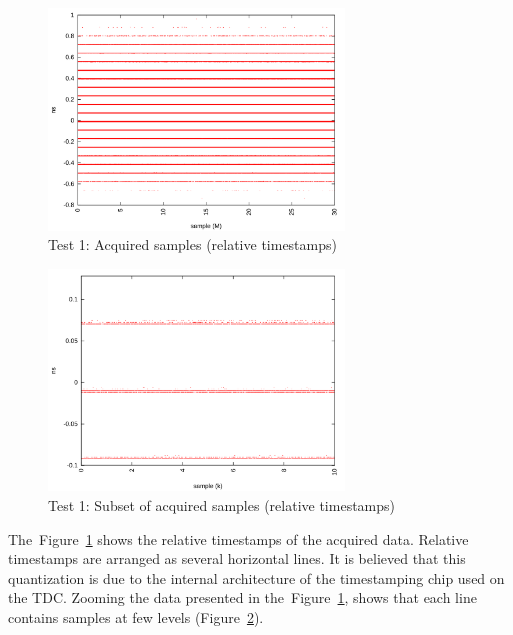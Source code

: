\documentclass[a4paper, 12pt]{article}
\begin{document}
\FloatBarrier

\begin{figure}[ht!]
  \centering
  \includegraphics[width=0.7\textwidth]{img/test1_samples_relative.png}
  \caption{Test 1: Acquired samples (relative timestamps)}
  \label{test1_relative}
\end{figure}

\begin{figure}[ht!]
  \centering
  \includegraphics[width=0.7\textwidth]{img/test1_samples_relative_zoomxy.png}
  \caption{Test 1: Subset of acquired samples (relative timestamps)}
  \label{test1_relative_zoomy}
\end{figure}

The~Figure~\ref{test1_relative} shows the relative timestamps of the acquired
data.
Relative timestamps are arranged as several horizontal lines.
It is believed that this quantization is due to the internal architecture of
the timestamping chip used on the TDC.
Zooming the data presented in the~Figure~\ref{test1_relative}, shows that each
line contains samples at few levels (Figure~\ref{test1_relative_zoomy}).

\FloatBarrier
\end{document}
